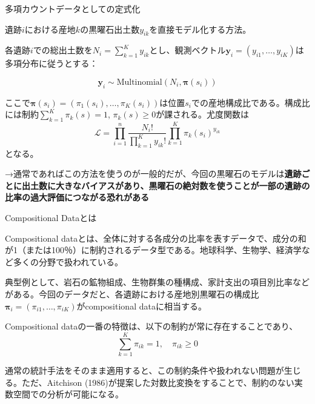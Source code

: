 \documentclass[xelatex, 8pt]{beamer}
\theoremstyle{plain}
\theoremstyle{definition}
\begin{document}
\begin{frame}{多項カウントデータとしての定式化}

遺跡$i$における産地$k$の黒曜石出土数$y_{ik}$を直接モデル化する方法。

\vspace{2mm}

各遺跡$i$での総出土数を$N_i = \sum_{k=1}^K y_{ik}$とし、観測ベクトル$\mathbf{y}_i = (y_{i1}, \ldots, y_{iK})$は多項分布に従うとする：

$$\mathbf{y}_i \sim \text{Multinomial}(N_i, \boldsymbol{\pi}(s_i))$$

ここで$\boldsymbol{\pi}(s_i) = (\pi_1(s_i), \ldots, \pi_K(s_i))$は位置$s_i$での産地構成比である。構成比には制約$\sum_{k=1}^K \pi_k(s) = 1$, $\pi_k(s) \geq 0$が課される。尤度関数は
$$\mathcal{L} = \prod_{i=1}^n \frac{N_i!}{\prod_{k=1}^K y_{ik}!} \prod_{k=1}^K \pi_k(s_i)^{y_{ik}}$$
となる。

\vspace{2mm}
→通常であればこの方法を使うのが一般的だが、今回の黒曜石のモデルは\textbf{遺跡ごとに出土数に大きなバイアスがあり、黒曜石の絶対数を使うことが一部の遺跡の比率の過大評価につながる恐れがある}

\end{frame}

\begin{frame}{Compositional Dataとは}

Compositional dataとは、全体に対する各成分の比率を表すデータで、成分の和が1（または100％）に制約されるデータ型である。地球科学、生物学、経済学など多くの分野で扱われている。

典型例として、岩石の鉱物組成、生物群集の種構成、家計支出の項目別比率などがある。今回のデータだと、各遺跡における産地別黒曜石の構成比$\boldsymbol{\pi}_i = (\pi_{i1}, \ldots, \pi_{iK})$がcompositional dataに相当する。

Compositional dataの一番の特徴は、以下の制約が常に存在することであり、
$$\sum_{k=1}^K \pi_{ik} = 1, \quad \pi_{ik} \geq 0$$

通常の統計手法をそのまま適用すると、この制約条件や扱われない問題が生じる。ただ、Aitchison (1986)が提案した対数比変換をすることで、制約のない実数空間での分析が可能になる。

\end{frame}
\end{document}
